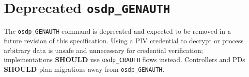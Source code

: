 \section{Deprecated \texttt{osdp\_GENAUTH}}

The \texttt{osdp\_GENAUTH} command is deprecated and expected to be removed in a future revision of this specification. Using a PIV credential to decrypt or process arbitrary data is unsafe and unnecessary for credential verification; implementations \textbf{SHOULD} use \texttt{osdp\_CRAUTH} flows instead. Controllers and PDs \textbf{SHOULD} plan migrations away from \texttt{osdp\_GENAUTH}.
